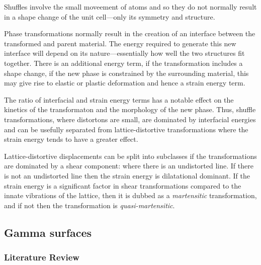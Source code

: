 \documentclass[11pt]{article}
\begin{document}
\begin{enumerate}
\begin{enumerate}
Shuffles involve the small moveement of atoms and so they do not normally
result in a shape change of the unit cell---only its symmetry and structure. 

Phase transformations normally result in the creation of an interface between
the transformed and parent material. 
The energy required to generate this new interface will depend on its
nature---essentially how well the two structures fit together. There is an
additional energy term, if the transformation includes a shape change,
if the new phase is constrained by the surrounding material, this may give
rise to  elastic or plastic deformation and hence a strain energy term. 

The ratio of interfacial and strain energy terms has a notable effect on the
kinetics of the transformaton and the morphology of the new phase. Thus,
shuffle transformations, where distortons are small, are dominated by
interfacial energies and can be usefully separated from lattice-distortive
transformations where the strain energy tends to have a greater effect. 

Lattice-distortive displacements can be split into subclasses if the
transformations are dominated by a shear component: where there is an
undistorted line. If there is not an undistorted line then the strain energy
is dilatational dominant. If the strain energy is a significant factor in shear
transformations compared to the innate vibrations of the lattice, 
then it is dubbed as a \emph{martensitic} transformation, and if not
then the transformation is \emph{quasi-martensitic}.
\end{enumerate}
\end{enumerate}

\subsection{Gamma surfaces}
\label{sec:orgc62000e}

\subsubsection{Literature Review}
\label{sec:org31c7708}
\end{document}

